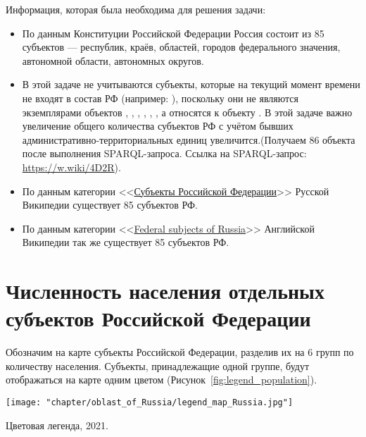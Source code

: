 Информация, которая была необходима для решения задачи:
\begin{itemize}
  \item По данным Конституции Российской Федерации Россия состоит из 85 субъектов — республик, краёв, областей, городов федерального значения, автономной области, автономных округов.
  \item В этой задаче не учитываются субъекты, которые на текущий момент времени не входят в состав РФ (например: ), поскольку они не являются экземплярами объектов , , , , , , а относятся к объекту . В этой задаче важно увеличение общего количества субъектов РФ с учётом бывших административно-территориальных единиц увеличится.(Получаем 86 объекта после выполнения SPARQL-запроса. Ссылка на SPARQL-запрос: \href{https://w.wiki/4D2R}{https://w.wiki/4D2R}). 
  \item По данным категории <<\href{https://ru.wikipedia.org/wiki/Субъекты_Российской_Федерации}{Субъекты Российской Федерации}>> Русской Википедии существует 85 субъектов РФ.
  \item По данным категории <<\href{https://ru.wikipedia.org/wiki/en:Federal_subjects_of_Russia}{Federal subjects of Russia}>> Английской Википедии так же существует 85 субъектов РФ.
\end{itemize}

\section{Численность населения отдельных субъектов Российской Федерации}

Обозначим на карте субъекты Российской Федерации, разделив их на 6 групп по количеству населения. Субъекты, принадлежащие одной группе, будут отображаться на карте одним цветом (Рисунок~\ref{fig:legend_population}).

\begin{marginfigure}[0.0cm]
{
	\setlength{\fboxsep}{0pt}%
	\setlength{\fboxrule}{1pt}%
	\texttt{[image: "chapter/oblast\_of\_Russia/legend\_map\_Russia.jpg"]}
}
\caption [Цветовая легенда, 2021.]{Цветовая легенда, 2021.}%
\label{fig:legend_population}%
\end{marginfigure}

